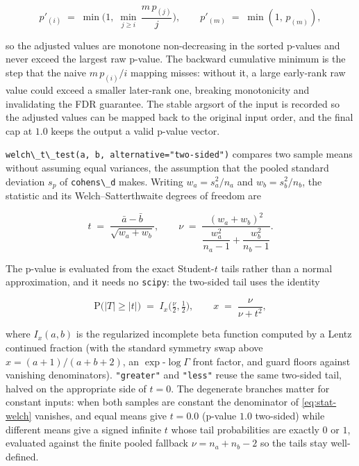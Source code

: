 \documentclass[
  10pt,
]{article}
\newcommand{\passthrough}[1]{#1}
\begin{document}
\begin{equation}
\label{eq:stat-bh}
p'_{(i)} \;=\;
\min\!\Big(1,\; \min_{j \ge i}\, \frac{m\,p_{(j)}}{j}\Big),
\qquad
p'_{(m)} \;=\; \min(1,\, p_{(m)}),
\end{equation}

so the adjusted values are monotone non-decreasing in the sorted
p-values and never exceed the largest raw p-value. The backward
cumulative minimum is the step that the naive \(m\,p_{(i)}/i\) mapping
misses: without it, a large early-rank raw value could exceed a smaller
later-rank one, breaking monotonicity and invalidating the FDR
guarantee. The stable argsort of the input is recorded so the adjusted
values can be mapped back to the original input order, and the final cap
at \(1.0\) keeps the output a valid p-value vector.

\passthrough{\lstinline!welch\_t\_test(a, b, alternative="two-sided")!}
compares two sample means without assuming equal variances, the
assumption that the pooled standard deviation \(s_p\) of
\passthrough{\lstinline!cohens\_d!} makes. Writing \(w_a = s_a^2/n_a\)
and \(w_b = s_b^2/n_b\), the statistic and its Welch--Satterthwaite
degrees of freedom are

\begin{equation}
\label{eq:stat-welch}
t \;=\; \frac{\bar{a} - \bar{b}}{\sqrt{w_a + w_b}},
\qquad
\nu \;=\;
\frac{(w_a + w_b)^{2}}
{\dfrac{w_a^{2}}{n_a - 1} + \dfrac{w_b^{2}}{n_b - 1}} .
\end{equation}

The p-value is evaluated from the exact Student-\(t\) tails rather than
a normal approximation, and it needs no \passthrough{\lstinline!scipy!}:
the two-sided tail uses the identity

\begin{equation}
\label{eq:stat-tail}
\mathrm{P}\big(|T| \ge |t|\big) \;=\; I_{x}\!\big(\tfrac{\nu}{2},
\tfrac{1}{2}\big),
\qquad
x \;=\; \frac{\nu}{\nu + t^{2}},
\end{equation}

where \(I_x(a, b)\) is the regularized incomplete beta function computed
by a Lentz continued fraction (with the standard symmetry swap above
\(x = (a+1)/(a+b+2)\), an \(\exp\)-\(\log\Gamma\) front factor, and
guard floors against vanishing denominators).
\passthrough{\lstinline!"greater"!} and \passthrough{\lstinline!"less"!}
reuse the same two-sided tail, halved on the appropriate side of
\(t = 0\). The degenerate branches matter for constant inputs: when both
samples are constant the denominator of \eqref{eq:stat-welch} vanishes,
and equal means give \(t = 0.0\) (p-value \(1.0\) two-sided) while
different means give a signed infinite \(t\) whose tail probabilities
are exactly \(0\) or \(1\), evaluated against the finite pooled fallback
\(\nu = n_a + n_b - 2\) so the tails stay well-defined.
\end{document}
